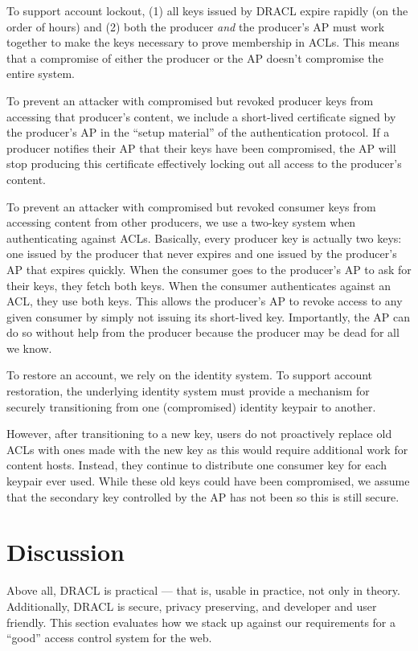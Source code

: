 \documentclass[pdftex,12pt,a4papaer,twoside,notitlepage]{report}
\begin{document}
To support account lockout, (1) all keys issued by DRACL expire rapidly (on the
order of hours) and (2) both the producer \emph{and} the producer's AP must work
together to make the keys necessary to prove membership in ACLs. This means that
a compromise of either the producer or the AP doesn't compromise the entire system.

To prevent an attacker with compromised but revoked producer keys from accessing
that producer's content, we include a short-lived certificate signed by the
producer's AP in the ``setup material'' of the authentication protocol. If a
producer notifies their AP that their keys have been compromised, the AP will
stop producing this certificate effectively locking out all access to the
producer's content.

To prevent an attacker with compromised but revoked consumer keys from accessing
content from other producers, we use a two-key system when authenticating
against ACLs. Basically, every producer key is actually two keys: one issued by
the producer that never expires and one issued by the producer's AP that expires
quickly. When the consumer goes to the producer's AP to ask for their keys, they
fetch both keys. When the consumer authenticates against an ACL, they use both
keys. This allows the producer's AP to revoke access to any given consumer by
simply not issuing its short-lived key. Importantly, the AP can do so without
help from the producer because the producer may be dead for all we know.

To restore an account, we rely on the identity system. To support account
restoration, the underlying identity system must provide a mechanism for
securely transitioning from one (compromised) identity keypair to another.

However, after transitioning to a new key, users do not proactively replace old
ACLs with ones made with the new key as this would require additional work for
content hosts. Instead, they continue to distribute one consumer key for each
keypair ever used. While these old keys could have been compromised, we assume
that the secondary key controlled by the AP has not been so this is still
secure.

\chapter{Discussion}

Above all, DRACL is practical --- that is, usable in practice, not only in
theory. Additionally, DRACL is secure, privacy preserving, and developer and
user friendly. This section evaluates how we stack up against our requirements
for a ``good'' access control system for the web.
\end{document}

